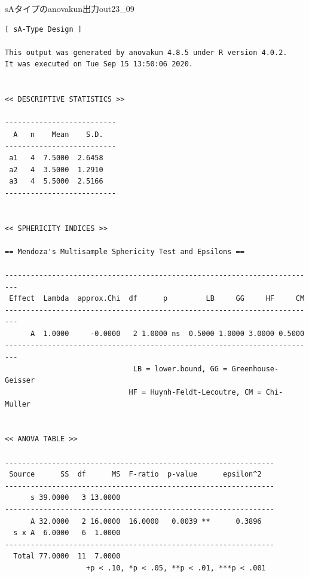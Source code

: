 \begin{Rscreen}{sAタイプのanovakun出力}{out23_09}
	\begin{verbatim}
[ sA-Type Design ]

This output was generated by anovakun 4.8.5 under R version 4.0.2.
It was executed on Tue Sep 15 13:50:06 2020.

 
<< DESCRIPTIVE STATISTICS >>

--------------------------
  A   n    Mean    S.D. 
--------------------------
 a1   4  7.5000  2.6458 
 a2   4  3.5000  1.2910 
 a3   4  5.5000  2.5166 
--------------------------


<< SPHERICITY INDICES >>

== Mendoza's Multisample Sphericity Test and Epsilons ==

-------------------------------------------------------------------------
 Effect  Lambda  approx.Chi  df      p         LB     GG     HF     CM 
-------------------------------------------------------------------------
      A  1.0000     -0.0000   2 1.0000 ns  0.5000 1.0000 3.0000 0.5000 
-------------------------------------------------------------------------
                              LB = lower.bound, GG = Greenhouse-Geisser
                             HF = Huynh-Feldt-Lecoutre, CM = Chi-Muller


<< ANOVA TABLE >>

---------------------------------------------------------------
 Source      SS  df      MS  F-ratio  p-value      epsilon^2 
---------------------------------------------------------------
      s 39.0000   3 13.0000                                  
---------------------------------------------------------------
      A 32.0000   2 16.0000  16.0000   0.0039 **      0.3896 
  s x A  6.0000   6  1.0000                                  
---------------------------------------------------------------
  Total 77.0000  11  7.0000                                  
                   +p < .10, *p < .05, **p < .01, ***p < .001
\end{verbatim}
\end{Rscreen}
